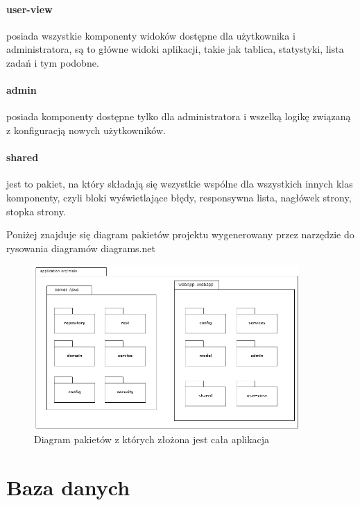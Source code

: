 \paragraph{user-view} posiada wszystkie komponenty widoków dostępne dla użytkownika i administratora, są to główne widoki aplikacji, takie jak tablica, statystyki, lista zadań i tym podobne.
\paragraph{admin} posiada komponenty dostępne tylko dla administratora i wszelką logikę związaną z konfiguracją nowych użytkowników.
\paragraph{shared} jest to pakiet, na który składają się wszystkie wspólne dla wszystkich innych klas komponenty, czyli bloki wyświetlające błędy, responsywna lista, nagłówek strony, stopka strony. 

Poniżej znajduje się diagram pakietów projektu wygenerowany przez narzędzie do rysowania diagramów diagrams.net \cite{diagrams}
\begin{figure}[h]
	
	\centering
	\includegraphics[width=0.90\textwidth]{pakiety}		
	\caption{Diagram pakietów z których złożona jest cała aplikacja }
	\label{pakiet}
\end{figure}


\section{Baza danych}

